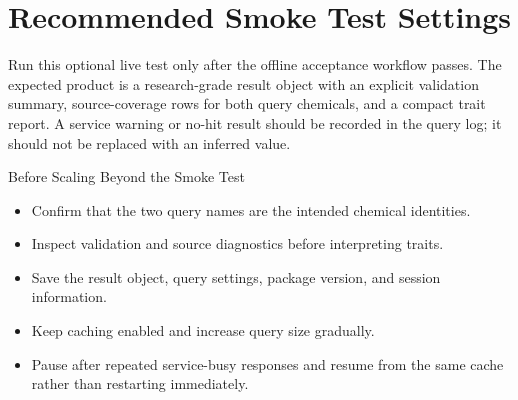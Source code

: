 \clearpage
\section{Recommended Smoke Test Settings}

Run this optional live test only after the offline acceptance workflow passes.
The expected product is a research-grade result object with an explicit
validation summary, source-coverage rows for both query chemicals, and a
compact trait report. A service warning or no-hit result should be recorded in
the query log; it should not be replaced with an inferred value.

\begin{checklistbox}{Before Scaling Beyond the Smoke Test}
\begin{itemize}
  \item Confirm that the two query names are the intended chemical identities.
  \item Inspect validation and source diagnostics before interpreting traits.
  \item Save the result object, query settings, package version, and session
        information.
  \item Keep caching enabled and increase query size gradually.
  \item Pause after repeated service-busy responses and resume from the same
        cache rather than restarting immediately.
\end{itemize}
\end{checklistbox}

